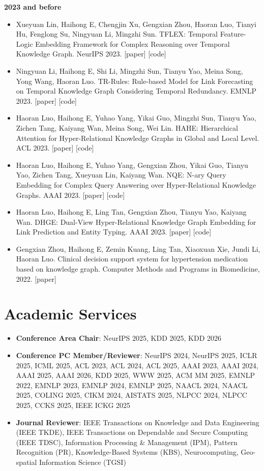 \documentclass[letterpaper,11pt]{article}
\newcommand{\resumeSubHeadingListStart}{\begin{itemize}[leftmargin=*]}
\newcommand{\resumeSubHeadingListEnd}{\end{itemize}}
\begin{document}
\textbf{2023 and before}
\vspace{-1mm}
\resumeSubHeadingListStart
\item Xueyuan Lin, Haihong E, Chengjin Xu, Gengxian Zhou, Haoran Luo, Tianyi Hu, Fenglong Su, Ningyuan Li, Mingzhi Sun. TFLEX: Temporal Feature-Logic Embedding Framework for Complex Reasoning over Temporal Knowledge Graph. NeurIPS 2023. [paper] [code]
\item Ningyuan Li, Haihong E, Shi Li, Mingzhi Sun, Tianyu Yao, Meina Song, Yong Wang, Haoran Luo. TR-Rules: Rule-based Model for Link Forecasting on Temporal Knowledge Graph Considering Temporal Redundancy. EMNLP 2023. [paper] [code]
\item Haoran Luo, Haihong E, Yuhao Yang, Yikai Guo, Mingzhi Sun, Tianyu Yao, Zichen Tang, Kaiyang Wan, Meina Song, Wei Lin. HAHE: Hierarchical Attention for Hyper-Relational Knowledge Graphs in Global and Local Level. ACL 2023. [paper] [code]
\item Haoran Luo, Haihong E, Yuhao Yang, Gengxian Zhou, Yikai Guo, Tianyu Yao, Zichen Tang, Xueyuan Lin, Kaiyang Wan. NQE: N-ary Query Embedding for Complex Query Answering over Hyper-Relational Knowledge Graphs. AAAI 2023. [paper] [code]
\item Haoran Luo, Haihong E, Ling Tan, Gengxian Zhou, Tianyu Yao, Kaiyang Wan. DHGE: Dual-View Hyper-Relational Knowledge Graph Embedding for Link Prediction and Entity Typing. AAAI 2023. [paper] [code]
\item Gengxian Zhou, Haihong E, Zemin Kuang, Ling Tan, Xiaoxuan Xie, Jundi Li, Haoran Luo. Clinical decision support system for hypertension medication based on knowledge graph. Computer Methods and Programs in Biomedicine, 2022. [paper]
\resumeSubHeadingListEnd

%
\section{Academic Services}
 \resumeSubHeadingListStart
    \item \textbf{Conference Area Chair}: NeurIPS 2025, KDD 2025, KDD 2026
    \item \textbf{Conference PC Member/Reviewer}: NeurIPS 2024, NeurIPS 2025, ICLR 2025, ICML 2025, ACL 2023, ACL 2024, ACL 2025, AAAI 2023, AAAI 2024, AAAI 2025, AAAI 2026, KDD 2025, WWW 2025, ACM MM 2025, EMNLP 2022, EMNLP 2023, EMNLP 2024, EMNLP 2025, NAACL 2024, NAACL 2025, COLING 2025, CIKM 2024, AISTATS 2025, NLPCC 2024, NLPCC 2025, CCKS 2025, IEEE ICKG 2025
    \item \textbf{Journal Reviewer}: IEEE Transactions on Knowledge and Data Engineering (IEEE TKDE), IEEE Transactions on Dependable and Secure Computing (IEEE TDSC), Information Processing \& Management (IPM), Pattern Recognition (PR), Knowledge-Based Systems (KBS), Neurocomputing, Geo-spatial Information Science (TGSI)
 \resumeSubHeadingListEnd
\end{document}
